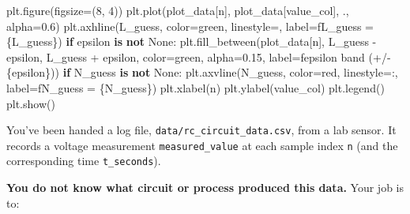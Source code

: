 \documentclass[
  letterpaper,
  DIV=11,
  numbers=noendperiod]{scrreprt}
\newenvironment{Shaded}{\begin{snugshade}}{\end{snugshade}}
\newcommand{\ControlFlowTok}[1]{\textcolor[rgb]{0.00,0.23,0.31}{\textbf{#1}}}
\newcommand{\DecValTok}[1]{\textcolor[rgb]{0.68,0.00,0.00}{#1}}
\newcommand{\FloatTok}[1]{\textcolor[rgb]{0.68,0.00,0.00}{#1}}
\newcommand{\KeywordTok}[1]{\textcolor[rgb]{0.00,0.23,0.31}{\textbf{#1}}}
\newcommand{\NormalTok}[1]{\textcolor[rgb]{0.00,0.23,0.31}{#1}}
\newcommand{\OperatorTok}[1]{\textcolor[rgb]{0.37,0.37,0.37}{#1}}
\newcommand{\SpecialCharTok}[1]{\textcolor[rgb]{0.37,0.37,0.37}{#1}}
\newcommand{\SpecialStringTok}[1]{\textcolor[rgb]{0.13,0.47,0.30}{#1}}
\newcommand{\StringTok}[1]{\textcolor[rgb]{0.13,0.47,0.30}{#1}}
\newcommand{\VariableTok}[1]{\textcolor[rgb]{0.07,0.07,0.07}{#1}}
\theoremstyle{plain}
\theoremstyle{plain}
\theoremstyle{definition}
\theoremstyle{definition}
\theoremstyle{definition}
\theoremstyle{plain}
\theoremstyle{plain}
\theoremstyle{remark}
\begin{document}
\begin{Shaded}
\begin{Highlighting}[]
\NormalTok{    plt.figure(figsize}\OperatorTok{=}\NormalTok{(}\DecValTok{8}\NormalTok{, }\DecValTok{4}\NormalTok{))}
\NormalTok{    plt.plot(plot\_data[}\StringTok{\textquotesingle{}n\textquotesingle{}}\NormalTok{], plot\_data[value\_col], }\StringTok{\textquotesingle{}.\textquotesingle{}}\NormalTok{, alpha}\OperatorTok{=}\FloatTok{0.6}\NormalTok{)}
\NormalTok{    plt.axhline(L\_guess, color}\OperatorTok{=}\StringTok{\textquotesingle{}green\textquotesingle{}}\NormalTok{, linestyle}\OperatorTok{=}\StringTok{\textquotesingle{}{-}{-}\textquotesingle{}}\NormalTok{, label}\OperatorTok{=}\SpecialStringTok{f\textquotesingle{}L\_guess = }\SpecialCharTok{\{}\NormalTok{L\_guess}\SpecialCharTok{\}}\SpecialStringTok{\textquotesingle{}}\NormalTok{)}
    \ControlFlowTok{if}\NormalTok{ epsilon }\KeywordTok{is} \KeywordTok{not} \VariableTok{None}\NormalTok{:}
\NormalTok{        plt.fill\_between(plot\_data[}\StringTok{\textquotesingle{}n\textquotesingle{}}\NormalTok{], L\_guess }\OperatorTok{{-}}\NormalTok{ epsilon, L\_guess }\OperatorTok{+}\NormalTok{ epsilon,}
\NormalTok{                          color}\OperatorTok{=}\StringTok{\textquotesingle{}green\textquotesingle{}}\NormalTok{, alpha}\OperatorTok{=}\FloatTok{0.15}\NormalTok{, label}\OperatorTok{=}\SpecialStringTok{f\textquotesingle{}epsilon band (+/{-} }\SpecialCharTok{\{}\NormalTok{epsilon}\SpecialCharTok{\}}\SpecialStringTok{)\textquotesingle{}}\NormalTok{)}
    \ControlFlowTok{if}\NormalTok{ N\_guess }\KeywordTok{is} \KeywordTok{not} \VariableTok{None}\NormalTok{:}
\NormalTok{        plt.axvline(N\_guess, color}\OperatorTok{=}\StringTok{\textquotesingle{}red\textquotesingle{}}\NormalTok{, linestyle}\OperatorTok{=}\StringTok{\textquotesingle{}:\textquotesingle{}}\NormalTok{, label}\OperatorTok{=}\SpecialStringTok{f\textquotesingle{}N\_guess = }\SpecialCharTok{\{}\NormalTok{N\_guess}\SpecialCharTok{\}}\SpecialStringTok{\textquotesingle{}}\NormalTok{)}
\NormalTok{    plt.xlabel(}\StringTok{\textquotesingle{}n\textquotesingle{}}\NormalTok{)}
\NormalTok{    plt.ylabel(value\_col)}
\NormalTok{    plt.legend()}
\NormalTok{    plt.show()}
\end{Highlighting}
\end{Shaded}

You've been handed a log file, \texttt{data/rc\_circuit\_data.csv}, from
a lab sensor. It records a voltage measurement \texttt{measured\_value}
at each sample index \texttt{n} (and the corresponding time
\texttt{t\_seconds}).

\textbf{You do not know what circuit or process produced this data.}
Your job is to:
\end{document}
